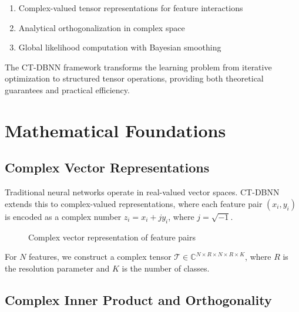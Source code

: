 \documentclass[journal]{IEEEtran}
\begin{document}
\begin{enumerate}
\item Complex-valued tensor representations for feature interactions
\item Analytical orthogonalization in complex space
\item Global likelihood computation with Bayesian smoothing
\end{enumerate}

The CT-DBNN framework transforms the learning problem from iterative optimization to structured tensor operations, providing both theoretical guarantees and practical efficiency.

\section{Mathematical Foundations}

\subsection{Complex Vector Representations}

Traditional neural networks operate in real-valued vector spaces. CT-DBNN extends this to complex-valued representations, where each feature pair $(x_i, y_i)$ is encoded as a complex number $z_i = x_i + jy_i$, where $j = \sqrt{-1}$.

\begin{figure}[!ht]
\centering
{}
\caption{Complex vector representation of feature pairs}
\label{fig:complex_rep}
\end{figure}

For $N$ features, we construct a complex tensor $\mathcal{T} \in \mathbb{C}^{N \times R \times N \times R \times K}$, where $R$ is the resolution parameter and $K$ is the number of classes.

\subsection{Complex Inner Product and Orthogonality}
\end{document}
